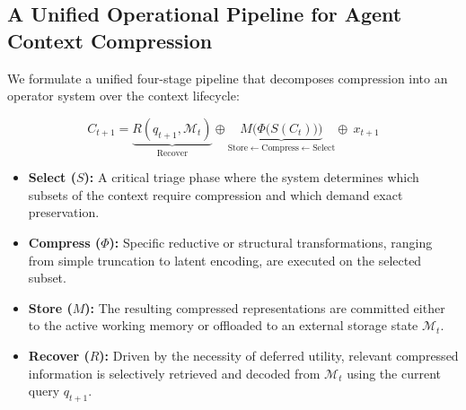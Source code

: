 \subsection{A Unified Operational Pipeline for Agent Context Compression}
\label{subsec:unified_pipeline}

We formulate a unified four-stage pipeline that decomposes compression into an operator system over the context lifecycle:

{\setlength{\abovedisplayskip}{4pt}
\setlength{\belowdisplayskip}{4pt}
\setlength{\abovedisplayshortskip}{2pt}
\setlength{\belowdisplayshortskip}{2pt}
\vspace{-.3cm}
\begin{equation}
    C_{t+1} = \underbrace{R(q_{t+1}, \mathcal{M}_{t})}_{\text{Recover}} \oplus \underbrace{M\Big(\Phi\big(S(C_{t})\big)\Big)}_{\text{Store} \leftarrow \text{Compress} \leftarrow \text{Select}} \oplus \ x_{t+1} \label{eq:pipeline}
\end{equation}
}

\begin{itemize}[leftmargin=*, parsep=0pt, topsep=1pt, itemsep=1pt]
    \item \textbf{Select ($S$):} A critical triage phase where the system determines which subsets of the context require compression and which demand exact preservation.
    \item \textbf{Compress ($\Phi$):} Specific reductive or structural transformations, ranging from simple truncation to latent encoding, are executed on the selected subset.
    \item \textbf{Store ($M$):} The resulting compressed representations are committed either to the active working memory or offloaded to an external storage state \(\mathcal{M}_t\).
    \item \textbf{Recover ($R$):} Driven by the necessity of deferred utility, relevant compressed information is selectively retrieved and decoded from \(\mathcal{M}_t\) using the current query \(q_{t+1}\).
\end{itemize}



